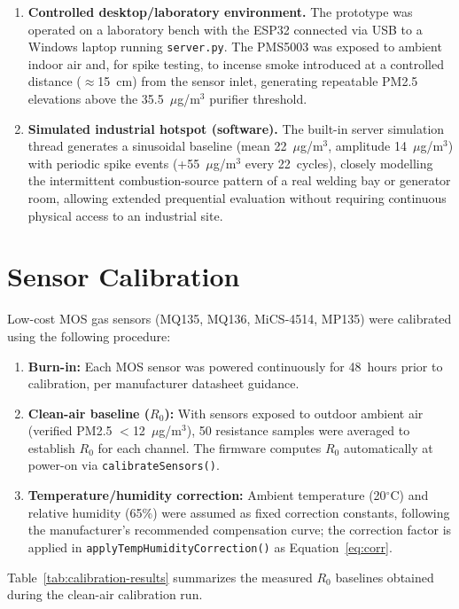 \begin{enumerate}
    \item \textbf{Controlled desktop/laboratory environment.} The prototype was operated on a laboratory bench with the ESP32 connected via USB to a Windows laptop running \texttt{server.py}. The PMS5003 was exposed to ambient indoor air and, for spike testing, to incense smoke introduced at a controlled distance ($\approx$15~cm) from the sensor inlet, generating repeatable PM2.5 elevations above the 35.5~$\mu$g/m$^3$ purifier threshold.
    \item \textbf{Simulated industrial hotspot (software).} The built-in server simulation thread generates a sinusoidal baseline (mean 22~$\mu$g/m$^3$, amplitude 14~$\mu$g/m$^3$) with periodic spike events (+55~$\mu$g/m$^3$ every 22~cycles), closely modelling the intermittent combustion-source pattern of a real welding bay or generator room, allowing extended prequential evaluation without requiring continuous physical access to an industrial site.
\end{enumerate}

\section{Sensor Calibration}
\label{sec:exp-calibration}

Low-cost MOS gas sensors (MQ135, MQ136, MiCS-4514, MP135) were calibrated using the following procedure:

\begin{enumerate}
    \item \textbf{Burn-in:} Each MOS sensor was powered continuously for 48~hours prior to calibration, per manufacturer datasheet guidance.
    \item \textbf{Clean-air baseline ($R_0$):} With sensors exposed to outdoor ambient air (verified PM2.5 $<$12~$\mu$g/m$^3$), 50 resistance samples were averaged to establish $R_0$ for each channel. The firmware computes $R_0$ automatically at power-on via \texttt{calibrateSensors()}.
    \item \textbf{Temperature/humidity correction:} Ambient temperature (20$^\circ$C) and relative humidity (65\%) were assumed as fixed correction constants, following the manufacturer's recommended compensation curve; the correction factor is applied in \texttt{applyTempHumidityCorrection()} as Equation~\ref{eq:corr}.
\end{enumerate}

Table~\ref{tab:calibration-results} summarizes the measured $R_0$ baselines obtained during the clean-air calibration run.

